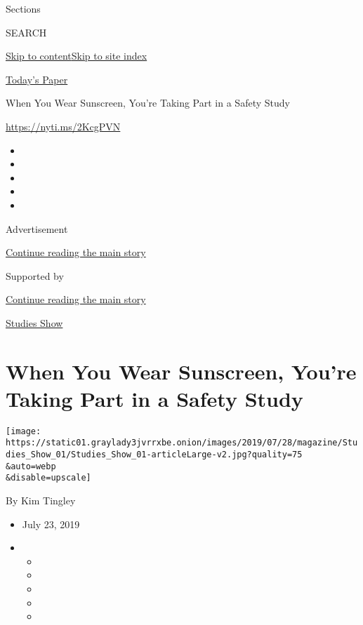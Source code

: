 Sections

SEARCH

\protect\hyperlink{site-content}{Skip to
content}\protect\hyperlink{site-index}{Skip to site index}

\href{https://myaccount.nytimes3xbfgragh.onion/auth/login?response_type=cookie\&client_id=vi}{}

\href{https://www.nytimes3xbfgragh.onion/section/todayspaper}{Today's
Paper}

When You Wear Sunscreen, You're Taking Part in a Safety Study

\url{https://nyti.ms/2KcgPVN}

\begin{itemize}
\item
\item
\item
\item
\item
\end{itemize}

Advertisement

\protect\hyperlink{after-top}{Continue reading the main story}

Supported by

\protect\hyperlink{after-sponsor}{Continue reading the main story}

\href{/column/studies-show}{Studies Show}

\hypertarget{when-you-wear-sunscreen-youre-taking-part-in-a-safety-study}{%
\section{When You Wear Sunscreen, You're Taking Part in a Safety
Study}\label{when-you-wear-sunscreen-youre-taking-part-in-a-safety-study}}

\texttt{[image: https://static01.graylady3jvrrxbe.onion/images/2019/07/28/magazine/Studies\_Show\_01/Studies\_Show\_01-articleLarge-v2.jpg?quality=75\\\&auto=webp\\\&disable=upscale]}

By Kim Tingley

\begin{itemize}
\item
  July 23, 2019
\item
  \begin{itemize}
  \item
  \item
  \item
  \item
  \item
  \end{itemize}
\end{itemize}

